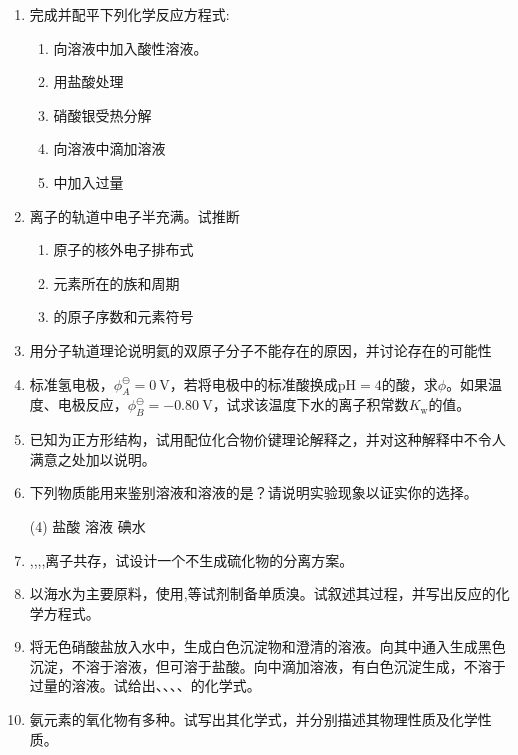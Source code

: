 \begin{enumerate}[label=\arabic*., start=1, itemsep=1.5ex]
    \item 完成并配平下列化学反应方程式:
    \begin{enumerate}[label=(\arabic*), itemsep=1ex]
        \item 向溶液中加入酸性溶液。
        \item 用盐酸处理
        \item 硝酸银受热分解
        \item 向溶液中滴加溶液
        \item {}中加入过量
    \end{enumerate}

    \item {}离子的轨道中电子半充满。试推断
    \begin{enumerate}
        \item {}原子的核外电子排布式
        \item {}元素所在的族和周期
        \item {}的原子序数和元素符号
    \end{enumerate}

    \item 用分子轨道理论说明氦的双原子分子不能存在的原因，并讨论存在的可能性

    \item 标准氢电极，$\phi^{\ominus}_{A} = 0\ \text{V}$，若将电极中的标准酸换成$\text{pH}=4$的酸，求$\phi$。如果温度、电极反应，$\phi^{\ominus}_{B} = -0.80\ \text{V}$，试求该温度下水的离子积常数$K_\text{w}$的值。

    \item 已知为正方形结构，试用配位化合物价键理论解释之，并对这种解释中不令人满意之处加以说明。

    \item 下列物质能用来鉴别溶液和溶液的是？请说明实验现象以证实你的选择。
    \begin{tasks}(4)
        \task 盐酸
        \task {}溶液
        \task {}
        \task 碘水
    \end{tasks}

    \item {},,,,离子共存，试设计一个不生成硫化物的分离方案。

    \item 以海水为主要原料，使用,等试剂制备单质溴。试叙述其过程，并写出反应的化学方程式。

    \item 将无色硝酸盐放入水中，生成白色沉淀物和澄清的溶液。向其中通入生成黑色沉淀，不溶于溶液，但可溶于盐酸。向中滴加溶液，有白色沉淀生成，不溶于过量的溶液。试给出、、、、的化学式。

    \item 氨元素的氧化物有多种。试写出其化学式，并分别描述其物理性质及化学性质。

\end{enumerate}